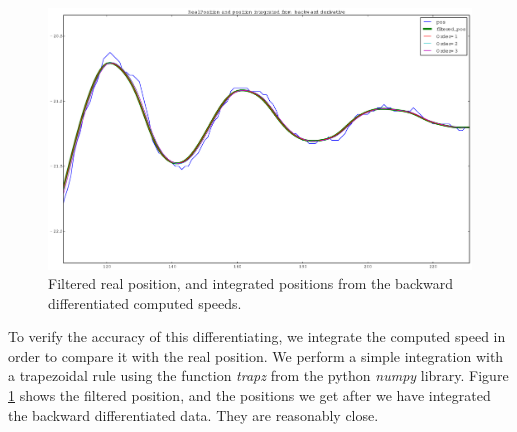 \documentclass[10pt,a4paper]{report}
\begin{document}
\begin{figure}[ht]
\captionsetup{justification=centering}
\begin{center}
	\includegraphics[scale=0.25]{Figures/position_integrated.eps}
\end{center}
	\caption{Filtered real position, and integrated positions from the backward differentiated computed speeds.}
	
\label{fig:intposition}
\end{figure}

To verify the accuracy of this differentiating, we integrate the computed speed in order to compare it with the real position. We perform a simple integration with a trapezoidal rule using the function \textit{trapz} from the python \textit{numpy} library. Figure \ref{fig:intposition} shows the filtered position, and the positions we get after we have integrated the backward differentiated data. They are reasonably close.
\end{document}
